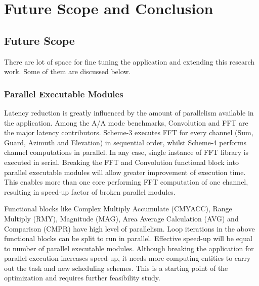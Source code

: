 \chapter{Future Scope and Conclusion}
\label{chap:conclusion}

\section{Future Scope}
There are lot of space for fine tuning the application and extending this research work. Some of them are discussed below.

\subsection{Parallel Executable Modules}
Latency reduction is greatly influenced by the amount of parallelism available in the application. Among the A/A mode benchmarks, Convolution and FFT are the major latency contributors. Scheme-3 executes FFT for every channel (Sum, Guard, Azimuth and Elevation) in sequential order, whilst Scheme-4 performs channel computations in parallel. In any case, single instance of FFT library is executed in serial. Breaking the FFT and Convolution functional block into parallel executable modules will allow greater improvement of execution time. This enables more than one core performing FFT computation of one channel, resulting in speed-up factor of broken parallel modules. \vspace*{0.2cm}

Functional blocks like Complex Multiply Accumulate (CMYACC), Range Multiply (RMY), Magnitude (MAG), Area Average Calculation (AVG) and Comparison (CMPR) have high level of parallelism. Loop iterations in the above functional blocks can be split to run in parallel. Effective speed-up will be equal to number of parallel executable modules. Although breaking the application for parallel execution increases speed-up, it needs more computing entities to carry out the task and new scheduling schemes. This is a starting point of the optimization and requires further feasibility study.

